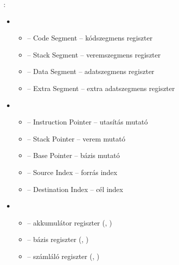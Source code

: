 \documentclass[main.tex]{subfiles}
\begin{document}
  {\large {}:}
  \begin{itemize}
    \item {}
    \begin{itemize}
      \item {} – Code Segment
      \tabto{4cm} – \tabto{4.6cm}
      kódszegmens regiszter
      
      \item {} – Stack Segment
      \tabto{4cm} – \tabto{4.6cm}
      veremszegmens regiszter

      \item {} – Data Segment
      \tabto{4cm} – \tabto{4.6cm}
      adatszegmens regiszter

      \item {} – Extra Segment
      \tabto{4cm} – \tabto{4.6cm}
      extra adatszegmens regiszter
    \end{itemize}

    \item {}
    \begin{itemize}
      \item {} – Instruction Pointer
      \tabto{4.8cm} – \tabto{5.4cm}
      utasítás mutató
      
      \item {} – Stack Pointer
      \tabto{4.8cm} – \tabto{5.4cm}
      verem mutató

      \item {} – Base Pointer
      \tabto{4.8cm} – \tabto{5.4cm}
      bázis mutató

      \item {} – Source Index
      \tabto{4.8cm} – \tabto{5.4cm}
      forrás index

      \item {} – Destination Index
      \tabto{4.8cm} – \tabto{5.4cm}
      cél index
    \end{itemize}

    \item {}
    \begin{itemize}
      \item {} – akkumulátor regiszter
      (, )
      
      \item {} – bázis regiszter
      (, )
      
      \item {} – számláló regiszter
      (, )
      

\end{itemize}
\end{itemize}
\end{document}
